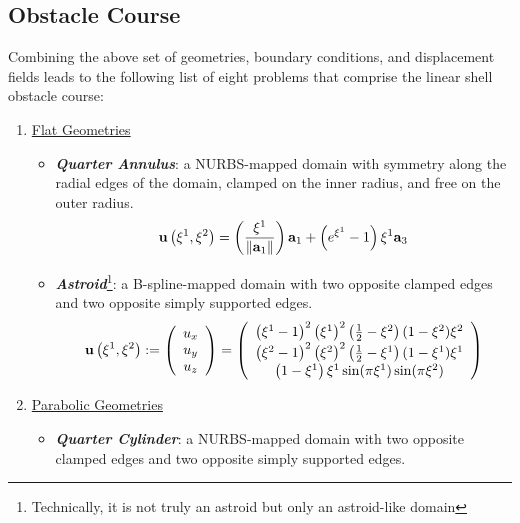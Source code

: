 \documentclass[10pt]{article}
\numberwithin{equation}{section}
\begin{document}
\subsection*{Obstacle Course}

Combining the above set of geometries, boundary conditions, and displacement fields leads to the following list of eight problems that comprise the linear shell obstacle course:
\begin{enumerate}
  \item[] \underline{Flat Geometries}
  \begin{itemize}
    \item \textbf{\emph{Quarter Annulus}}: a NURBS-mapped domain with symmetry along the radial edges of the domain, clamped on the inner radius, and free on the outer radius.
      \begin{equation*}
        {\bf u}\left( \xi^1, \xi^2 \right) = \left( \frac{\xi^1}{\|{\bf a}_1\|} \right) {\bf a}_1 + \left( e^{\xi^1} - 1 \right)\xi^1 {\bf a}_3
      \end{equation*}
    \item \textbf{\emph{Astroid}}\footnote{Technically, it is not truly an astroid but only an astroid-like domain}: a B-spline-mapped domain with two opposite clamped edges and two opposite simply supported edges.
    \begin{equation*}
      {\bf u} \left( \xi^1, \xi^2 \right) := \left( \begin{array}{c}
      u_x\\
      u_y\\
      u_z \end{array} \right) = \left( \begin{array}{c}
        \left( \xi^1 - 1 \right)^2 \left( \xi^1 \right)^2 \left( \frac{1}{2} - \xi^2 \right) (1 - \xi^2) \xi^2 \vspace{1pt}\\
        \left( \xi^2 - 1 \right)^2 \left( \xi^2 \right)^2 \left( \frac{1}{2} - \xi^1 \right) (1 - \xi^1) \xi^1 \vspace{1pt}\\
        \left( 1 - \xi^1 \right) \xi^1 \sin(\pi \xi^1) \sin(\pi \xi^2) \end{array} \right)
    \end{equation*}
  \end{itemize}
  \item[] \underline{Parabolic Geometries}
  \begin{itemize}
    \item \textbf{\emph{Quarter Cylinder}}: a NURBS-mapped domain with two opposite clamped edges and two opposite simply supported edges.

\end{itemize}
\end{enumerate}
\end{document}
